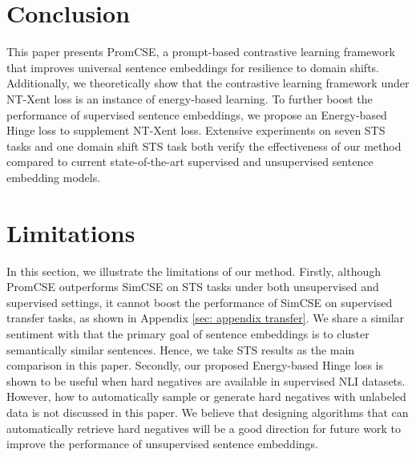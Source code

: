 \documentclass[11pt]{article}
\begin{document}
\section{Conclusion}
This paper presents PromCSE, a prompt-based contrastive learning framework that improves universal sentence embeddings for resilience to domain shifts. Additionally, we theoretically show that the contrastive learning framework under NT-Xent loss is an instance of energy-based learning. To further boost the performance of supervised sentence embeddings, we propose an Energy-based Hinge loss to supplement NT-Xent loss. 
Extensive experiments on seven STS tasks and one domain shift STS task both verify the effectiveness of our method compared to current state-of-the-art supervised and unsupervised sentence embedding models. 




































\section*{Limitations}
In this section, we illustrate the limitations of our method. Firstly, although PromCSE outperforms SimCSE on STS tasks under both unsupervised and supervised settings, 
it cannot boost the performance of SimCSE on supervised transfer tasks, as shown in Appendix \ref{sec: appendix transfer}. 
We share a similar sentiment with \cite{ReimersG19sbert} that the primary goal of sentence embeddings is to cluster semantically similar sentences. Hence, we take STS results as the main comparison in this paper. 
Secondly, our proposed Energy-based Hinge loss is shown to be useful when hard negatives are available in supervised NLI datasets. However, how to automatically sample or generate hard negatives with unlabeled data is not discussed in this paper. We believe that designing algorithms that can automatically retrieve hard negatives will be a good direction for future work to improve the performance of unsupervised sentence embeddings.
\end{document}
